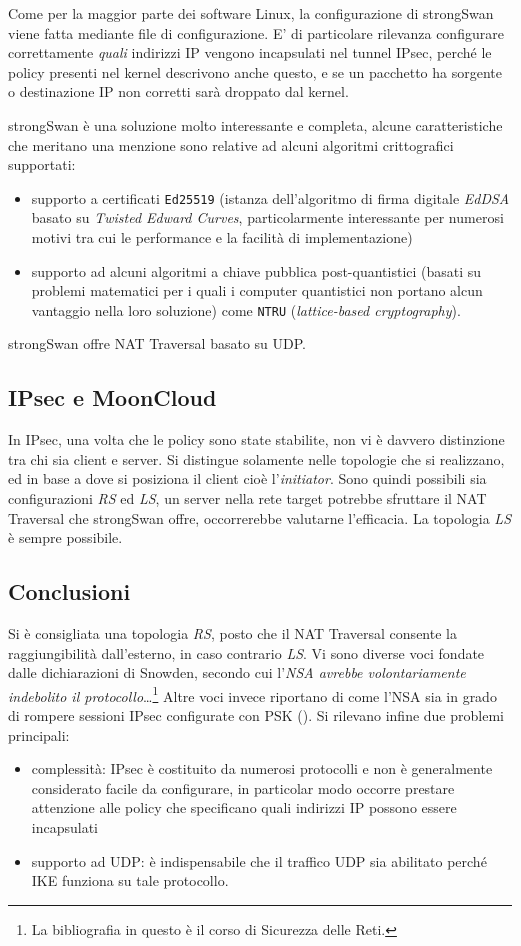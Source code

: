 Come per la maggior parte dei software Linux, la configurazione di strongSwan viene
fatta mediante file di configurazione.
E' di particolare rilevanza configurare correttamente \textit{quali} indirizzi IP vengono
incapsulati nel tunnel IPsec, perché le policy presenti nel kernel descrivono anche questo,
e se un pacchetto ha sorgente o destinazione IP non corretti sarà droppato dal kernel.

strongSwan è una soluzione molto interessante e completa, alcune caratteristiche
che meritano una menzione sono relative ad alcuni algoritmi crittografici supportati:
\begin{itemize}
  \item supporto a certificati \texttt{Ed25519} (istanza dell'algoritmo di firma digitale
  \textit{EdDSA} basato su \textit{Twisted Edward Curves},
  particolarmente interessante per numerosi motivi tra cui le
  performance e la facilità di implementazione)
  \item supporto ad alcuni algoritmi a chiave pubblica post-quantistici (basati su
  problemi matematici per i quali i computer quantistici non portano alcun vantaggio
  nella loro soluzione) come \texttt{NTRU} (\textit{lattice-based cryptography}).
\end{itemize}
strongSwan offre NAT Traversal basato su UDP.


\subsection{IPsec e MoonCloud}
In IPsec, una volta
che le policy sono state stabilite, non vi è davvero distinzione tra chi sia client e server.
Si distingue solamente nelle topologie che si realizzano, ed in base a dove si posiziona il client cioè
l'\textit{initiator}.
Sono quindi possibili sia configurazioni \textit{RS} ed \textit{LS}, un server nella rete target
potrebbe sfruttare il NAT Traversal che strongSwan offre, occorrerebbe valutarne l'efficacia.
La topologia \textit{LS} è sempre possibile.


\subsection{Conclusioni}
Si è consigliata una topologia \textit{RS}, posto che il NAT Traversal consente
la raggiungibilità dall'esterno, in caso contrario \textit{LS}.
Vi sono diverse voci fondate dalle dichiarazioni di Snowden, secondo cui l'\textit{NSA avrebbe volontariamente
indebolito il protocollo}\ldots\footnote{La bibliografia in questo è il corso di Sicurezza delle Reti.}
Altre voci invece riportano di come l'NSA sia in grado di rompere sessioni IPsec
configurate con PSK (\cite{ipsec-nsa}).
Si rilevano infine due problemi principali:
\begin{itemize}
  \item complessità: IPsec è costituito da numerosi protocolli e non è generalmente considerato
  facile da configurare, in particolar modo occorre prestare attenzione alle policy che specificano
  quali indirizzi IP possono essere incapsulati
  \item supporto ad UDP: è indispensabile che il traffico UDP sia abilitato perché IKE funziona
  su tale protocollo.
\end{itemize}

